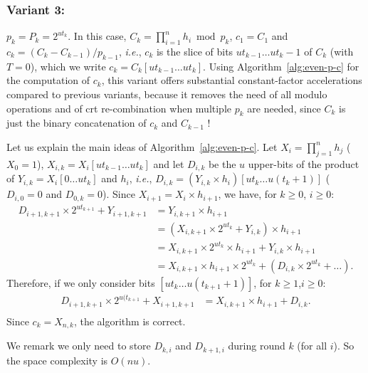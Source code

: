\documentclass[11pt]{llncs}
\begin{document}
\subsubsection{Variant 3:} $p_k = P_k = 2^{ut_k}$. 
In this case, $C_k = \prod_{i=1}^n h_i \bmod p_k$, $c_1 = C_1$ and $c_k = (C_k - C_{k-1}) / p_{k-1}$, {\it i.e.}, $c_k$ is the slice of bits $ut_{k-1}\dots ut_k-1$ of $C_k$ (with $T = 0$), which we write $c_k = C_k[ut_{k-1}\dots ut_k]$.
Using Algorithm~\ref{alg:even-p-c} for the computation of $c_k$, this variant offers substantial constant-factor accelerations compared to previous variants, because it removes the need of all modulo operations and of {\sc crt} re-combination when multiple $p_k$ are needed, since $C_k$ is just the binary concatenation of $c_k$ and $C_{k-1}$ !

Let us explain the main ideas of Algorithm~\ref{alg:even-p-c}.
Let $X_i = \prod_{j=1}^n h_j$ ($X_0 = 1$), $X_{i,k} = X_i[ut_{k-1}\dots ut_{k}]$ and let $D_{i,k}$ be the $u$ upper-bits of the product of $Y_{i,k} = X_i[0\dots ut_{k}]$ and $h_i$, {\it i.e.}, $D_{i,k} = (Y_{i,k} \times h_i)[ut_k\dots u(t_k+1)]$ ($D_{i,0} = 0$ and $D_{0,k} = 0$).
Since $X_{i+1} = X_i \times h_{i+1}$, we have, for $k \ge 0$, $i \ge 0$:
\begin{align*}
  D_{i+1,k+1} \times 2^{ut_{k+1}} + Y_{i+1,k+1} &= Y_{i,k+1} \times h_{i+1} \\
                 &= (X_{i,k+1} \times 2^{ut_{k}} + Y_{i,k}) \times h_{i+1} \\
                 &= X_{i,k+1} \times 2^{ut_k} \times h_{i+1} + Y_{i,k} \times h_{i+1} \\
                 &= X_{i,k+1}  \times h_{i+1} \times 2^{ut_k} + (D_{i,k} \times 2^{ut_k} + \dots).
\end{align*}
Therefore, if we only consider bits $[ut_k \dots u(t_{k+1}+1)]$, for $k\ge1$,$i\ge0$:
\begin{align*}
  D_{i+1,k+1} \times 2^{u(t_{k+1}} + X_{i+1,k+1} &= X_{i,k+1} \times h_{i+1} + D_{i,k}. \\
\end{align*}
Since $c_k = X_{n,k}$, the algorithm is correct.

We remark we only need to store $D_{k,i}$ and $D_{k+1,i}$ during round $k$ (for all $i$).
So the space complexity is $O(nu)$.
\end{document}

